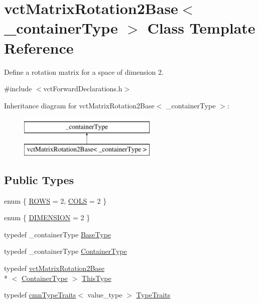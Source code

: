 \hypertarget{classvct_matrix_rotation2_base}{\section{vct\-Matrix\-Rotation2\-Base$<$ \-\_\-container\-Type $>$ Class Template Reference}
\label{classvct_matrix_rotation2_base}
}


Define a rotation matrix for a space of dimension 2.  




{\ttfamily \#include $<$vct\-Forward\-Declarations.\-h$>$}

Inheritance diagram for vct\-Matrix\-Rotation2\-Base$<$ \-\_\-container\-Type $>$\-:\begin{figure}[H]
\begin{center}
\leavevmode
\includegraphics[height=2.000000cm]{d2/dcd/classvct_matrix_rotation2_base}
\end{center}
\end{figure}
\subsection*{Public Types}
\begin{DoxyCompactItemize}
\item 
enum \{ \hyperlink{classvct_matrix_rotation2_base_aee21d1136c8b273c716774ceb24ea31bad80015187d3670804554f4bd9cec3822}{R\-O\-W\-S} = 2, 
\hyperlink{classvct_matrix_rotation2_base_aee21d1136c8b273c716774ceb24ea31babf5d0d692c30b7a19cc0c63d2bcc2113}{C\-O\-L\-S} = 2
 \}
\item 
enum \{ \hyperlink{classvct_matrix_rotation2_base_ac10279ed12ec787b1a4833ea02771348acefb9855f54f0cfd782e785c9083e592}{D\-I\-M\-E\-N\-S\-I\-O\-N} = 2
 \}
\item 
typedef \-\_\-container\-Type \hyperlink{classvct_matrix_rotation2_base_a3ce93aa444c1fadbc26ed0d5582ad33a}{Base\-Type}
\item 
typedef \-\_\-container\-Type \hyperlink{classvct_matrix_rotation2_base_ace2b6ba4773b1688b757cec782686180}{Container\-Type}
\item 
typedef \hyperlink{classvct_matrix_rotation2_base}{vct\-Matrix\-Rotation2\-Base}\\*
$<$ \hyperlink{classvct_matrix_rotation2_base_ace2b6ba4773b1688b757cec782686180}{Container\-Type} $>$ \hyperlink{classvct_matrix_rotation2_base_a47ffeef2ddecede4b16bcc88fb432ff5}{This\-Type}
\item 
typedef \hyperlink{classcmn_type_traits}{cmn\-Type\-Traits}$<$ value\-\_\-type $>$ \hyperlink{classvct_matrix_rotation2_base_abd9a728263fc154b76fecac0d9c19c4d}{Type\-Traits}
\end{DoxyCompactItemize}
